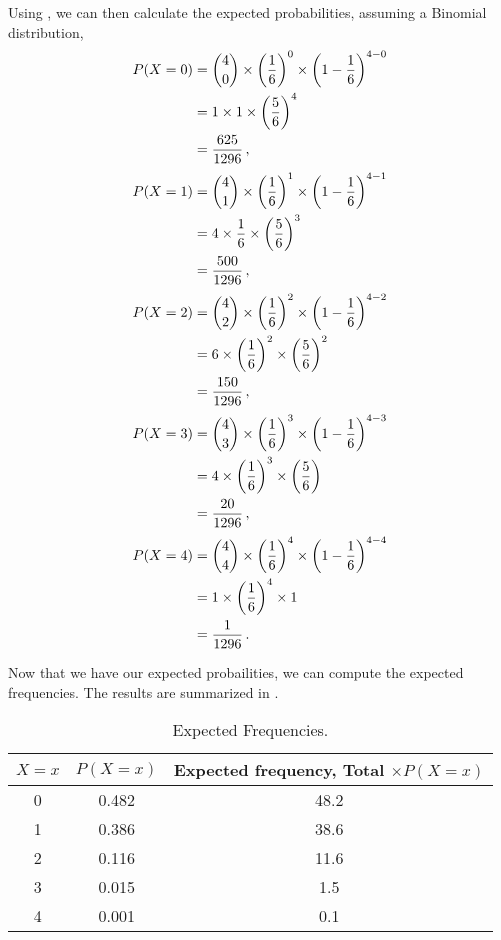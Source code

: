 \begin{subquestions}
Using , we can then calculate the expected probabilities, assuming a Binomial distribution,
\begin{align}
	P(X=0) & = { 4 \choose 0} \times \left(\frac{1}{6} \right)^0 \times \left(1-\frac{1}{6} \right)^{4-0} \nonumber \\
	       & = 1 \times 1 \times \left(\frac{5}{6} \right)^{4} \nonumber \\
	       & = \frac{625}{1296} \,,
\end{align}
\begin{align}
	P(X=1) & = { 4 \choose 1} \times \left(\frac{1}{6} \right)^1 \times \left(1-\frac{1}{6} \right)^{4-1} \nonumber \\
		   & = 4 \times \frac{1}{6} \times \left(\frac{5}{6} \right)^{3} \nonumber \\
		   & = \frac{500}{1296} \,,
\end{align}
\begin{align}
	P(X=2) & = { 4 \choose 2} \times \left(\frac{1}{6} \right)^2 \times \left(1-\frac{1}{6} \right)^{4-2} \nonumber \\
		   & = 6 \times \left(\frac{1}{6}\right)^2 \times \left(\frac{5}{6} \right)^{2} \nonumber \\
		   & = \frac{150}{1296} \,,
\end{align}
\begin{align}
	P(X=3) & = { 4 \choose 3} \times \left(\frac{1}{6} \right)^3 \times \left(1-\frac{1}{6} \right)^{4-3} \nonumber \\
		   & = 4 \times \left(\frac{1}{6}\right)^3 \times \left(\frac{5}{6} \right) \nonumber \\
      	   & = \frac{20}{1296} \,,
\end{align}
\begin{align}
    P(X=4) & = { 4 \choose 4} \times \left(\frac{1}{6} \right)^4 \times \left(1-\frac{1}{6} \right)^{4-4} \nonumber \\
    	   & = 1 \times \left(\frac{1}{6}\right)^4 \times 1 \nonumber \\
    	   & = \frac{1}{1296} \,.
\end{align}

Now that we have our expected probailities, we can compute the expected frequencies. The results are summarized in .
	
\begin{table}[H]
	\centering
	\begin{tabular}{|c|c|c|}
		\hline
		$X=x$ & $P(X=x)$ & Expected frequency, Total $\times P(X=x)$ \\
		\hline
		0 & 0.482 & 48.2 \\
		1 & 0.386 & 38.6 \\
		2 & 0.116 & 11.6 \\
		3 & 0.015 & 1.5 \\
		4 & 0.001 & 0.1 \\
		\hline
	\end{tabular}
	\caption{\label{2008M:q3:Bin1} Expected Frequencies.}
\end{table}


\end{subquestions}
